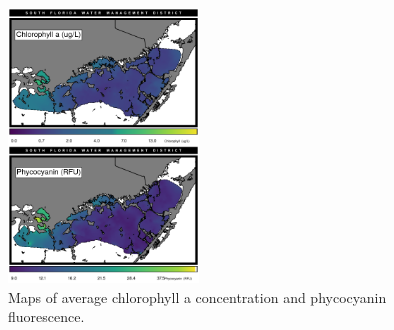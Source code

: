 \newpage



\begin{figure}
  \centering
  \includegraphics[width=0.45\textwidth]{../../figures/avmap.png}
  \caption{Maps of average chlorophyll a concentration and phycocyanin fluorescence.}
  \label{fig:6}
\end{figure}



